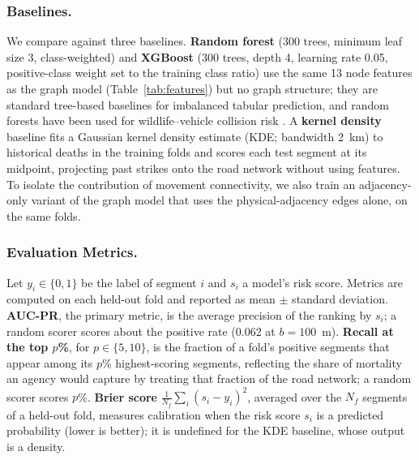 \documentclass[letterpaper]{article}
\begin{document}
\subsubsection{Baselines.} We compare against three baselines. \textbf{Random forest} \cite{Breiman2001} (300 trees, minimum leaf size 3, class-weighted) and \textbf{XGBoost} \cite{Chen2016XGBoost} (300 trees, depth 4, learning rate 0.05, positive-class weight set to the training class ratio) use the same 13 node features as the graph model (Table~\ref{tab:features}) but no graph structure; they are standard tree-based baselines for imbalanced tabular prediction, and random forests have been used for wildlife--vehicle collision risk \cite{pagany2022spatiotemporal}. A \textbf{kernel density} baseline fits a Gaussian kernel density estimate (KDE; bandwidth 2~km) to historical deaths in the training folds and scores each test segment at its midpoint, projecting past strikes onto the road network without using features. To isolate the contribution of movement connectivity, we also train an adjacency-only variant of the graph model that uses the physical-adjacency edges alone, on the same folds.

\subsubsection{Evaluation Metrics.} Let $y_i\in\{0,1\}$ be the label of segment $i$ and $s_i$ a model's risk score. Metrics are computed on each held-out fold and reported as mean $\pm$ standard deviation.
\textbf{AUC-PR}, the primary metric, is the average precision of the ranking by $s_i$; a random scorer scores about the positive rate (0.062 at $b=100$~m).
\textbf{Recall at the top $p$\%}, for $p\in\{5,10\}$, is the fraction of a fold's positive segments that appear among its $p$\% highest-scoring segments, reflecting the share of mortality an agency would capture by treating that fraction of the road network; a random scorer scores $p$\%.
\textbf{Brier score} $\frac{1}{N_f}\sum_i (s_i-y_i)^2$, averaged over the $N_f$ segments of a held-out fold, measures calibration when the risk score $s_i$ is a predicted probability (lower is better); it is undefined for the KDE baseline, whose output is a density.
\end{document}

